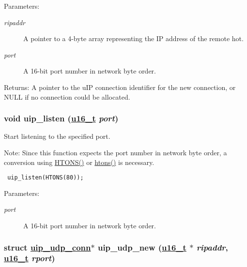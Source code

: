 \begin{Desc}
\item[Parameters:]
\begin{description}
\item[{\em ripaddr}]A pointer to a 4-byte array representing the IP address of the remote hot.\item[{\em port}]A 16-bit port number in network byte order.\end{description}
\end{Desc}
\begin{Desc}
\item[Returns:]A pointer to the u\-IP connection identifier for the new connection, or NULL if no connection could be allocated. \end{Desc}
\hypertarget{a00064_gdd1ab3704ecd4900eec61a6897d32dc8}{
\subsubsection[uip\_\-listen]{\setlength{\rightskip}{0pt plus 5cm}void uip\_\-listen (\hyperlink{a00070_gfc6499c1f28697aa3bfc2804d496fd11}{u16\_\-t} {\em port})}}
\label{a00064_gdd1ab3704ecd4900eec61a6897d32dc8}


Start listening to the specified port. 

\begin{Desc}
\item[Note:]Since this function expects the port number in network byte order, a conversion using \hyperlink{a00065_g69a7a4951ff21b302267532c21ee78fc}{HTONS()} or \hyperlink{a00065_ga22b04cac8cf283ca12f028578bebc06}{htons()} is necessary.\end{Desc}


\footnotesize\begin{verbatim} uip_listen(HTONS(80)); 
\end{verbatim}
\normalsize


\begin{Desc}
\item[Parameters:]
\begin{description}
\item[{\em port}]A 16-bit port number in network byte order. \end{description}
\end{Desc}
\hypertarget{a00064_g527ff0e535266167077b06d3a4742822}{
\subsubsection[uip\_\-udp\_\-new]{\setlength{\rightskip}{0pt plus 5cm}struct \hyperlink{a00032}{uip\_\-udp\_\-conn}$\ast$ uip\_\-udp\_\-new (\hyperlink{a00070_gfc6499c1f28697aa3bfc2804d496fd11}{u16\_\-t} $\ast$ {\em ripaddr}, \hyperlink{a00070_gfc6499c1f28697aa3bfc2804d496fd11}{u16\_\-t} {\em rport})}}
\label{a00064_g527ff0e535266167077b06d3a4742822}


